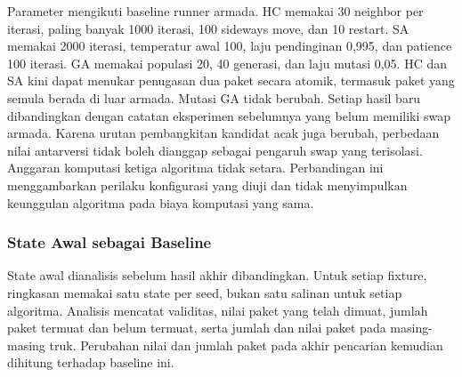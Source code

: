 Parameter mengikuti baseline runner armada. HC memakai 30 neighbor per iterasi, paling banyak 1000 iterasi, 100 sideways move, dan 10 restart. SA memakai 2000 iterasi, temperatur awal 100, laju pendinginan 0,995, dan patience 100 iterasi. GA memakai populasi 20, 40 generasi, dan laju mutasi 0,05. HC dan SA kini dapat menukar penugasan dua paket secara atomik, termasuk paket yang semula berada di luar armada. Mutasi GA tidak berubah. Setiap hasil baru dibandingkan dengan catatan eksperimen sebelumnya yang belum memiliki swap armada. Karena urutan pembangkitan kandidat acak juga berubah, perbedaan nilai antarversi tidak boleh dianggap sebagai pengaruh swap yang terisolasi. Anggaran komputasi ketiga algoritma tidak setara. Perbandingan ini menggambarkan perilaku konfigurasi yang diuji dan tidak menyimpulkan keunggulan algoritma pada biaya komputasi yang sama.

\subsubsection{State Awal sebagai Baseline}

State awal dianalisis sebelum hasil akhir dibandingkan. Untuk setiap fixture, ringkasan memakai satu state per seed, bukan satu salinan untuk setiap algoritma. Analisis mencatat validitas, nilai paket yang telah dimuat, jumlah paket termuat dan belum termuat, serta jumlah dan nilai paket pada masing-masing truk. Perubahan nilai dan jumlah paket pada akhir pencarian kemudian dihitung terhadap baseline ini.

